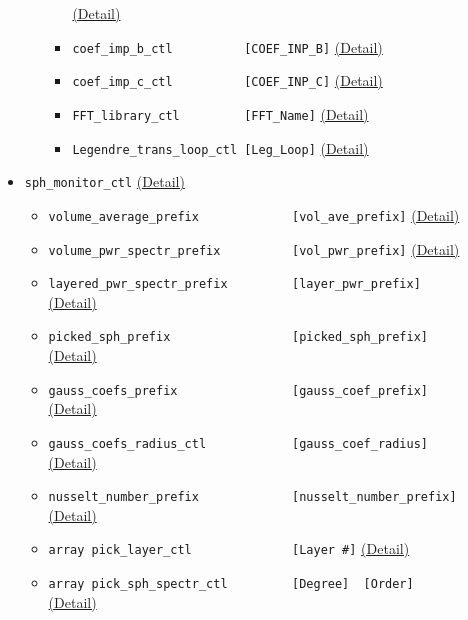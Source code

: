 \begin{itemize}
\begin{itemize}
\begin{itemize}
	    		\hyperref[href_t:coef_imp_t_ctl]{(Detail)}
		\item \verb|coef_imp_b_ctl          [COEF_INP_B]|
	    		\hyperref[href_t:coef_imp_b_ctl]{(Detail)}
		\item \verb|coef_imp_c_ctl          [COEF_INP_C]|
	    		\hyperref[href_t:coef_imp_c_ctl]{(Detail)}
		\item \verb|FFT_library_ctl         [FFT_Name]|
	    		\hyperref[href_t:FFT_library_ctl]{(Detail)}
		\item \verb|Legendre_trans_loop_ctl [Leg_Loop]|
	    		\hyperref[href_t:Legendre_trans_loop_ctl]{(Detail)}
		\end{itemize}
%
	\end{itemize}
%
\item \verb|sph_monitor_ctl|
	\label{href_i:sph_monitor_ctl}
	\hyperref[href_t:sph_monitor_ctl]{(Detail)}
	\begin{itemize}
	\item \verb|volume_average_prefix             [vol_ave_prefix]|
    		\hyperref[href_t:volume_average_prefix]{(Detail)}
	\item \verb|volume_pwr_spectr_prefix          [vol_pwr_prefix]|
    		\hyperref[href_t:volume_pwr_spectr_prefix]{(Detail)}
	\item \verb|layered_pwr_spectr_prefix         [layer_pwr_prefix]| \\
    		\hyperref[href_t:layered_pwr_spectr_prefix]{(Detail)}
	\item \verb|picked_sph_prefix                 [picked_sph_prefix]| \\
    		\hyperref[href_t:picked_sph_prefix]{(Detail)}
	\item \verb|gauss_coefs_prefix                [gauss_coef_prefix]| \\
    		\hyperref[href_t:gauss_coefs_prefix]{(Detail)}
	\item \verb|gauss_coefs_radius_ctl            [gauss_coef_radius]| \\
    		\hyperref[href_t:gauss_coefs_radius_ctl]{(Detail)}
	\item \verb|nusselt_number_prefix             [nusselt_number_prefix]| \\
    		\hyperref[href_t:nusselt_number_prefix]{(Detail)}
	\item \verb|array pick_layer_ctl              [Layer #]|
    		\hyperref[href_t:pick_layer_ctl]{(Detail)}
	\item \verb|array pick_sph_spectr_ctl         [Degree]  [Order]| \\
    		\hyperref[href_t:pick_sph_spectr_ctl]{(Detail)}

\end{itemize}
\end{itemize}
